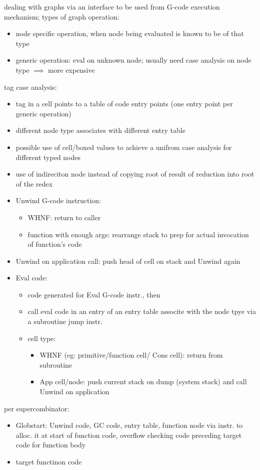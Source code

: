 \documentclass[8pt]{extarticle}
\begin{document}
\begin{multicols*}{2}
dealing with graphs via an interface to be used from G-code execution mechanism; types of graph operation:
\begin{itemize}
\item node specific operation, when node being evaluated is known to be of that type
\item generic operation: eval on unknown node; usually need case analysis on node type $\implies$ more expensive
\end{itemize}

tag case analysis:
\begin{itemize}
\item tag in a cell points to a table of code entry points (one entry point per generic operation)
\item different node type associates with different entry table
\item possible use of cell/boxed values to achieve a unifrom case analysis for different typed nodes
\item use of indireciton node instead of copying root of result of reduction into root of the redex
\item Unwind G-code instruction:
  \begin{itemize}
  \item WHNF: return to caller
  \item function with enough args: rearrange stack to prep for actual invocation of function's code
  \end{itemize}
\item Unwind on application call: push head of cell on stack and Unwind again
\item Eval code:
  \begin{itemize}
  \item code generated for Eval G-code instr., then
  \item call eval code in an entry of an entry table associte with the node tpye via a subroutine jump instr.
  \item cell type:
    \begin{itemize}
    \item WHNF (eg: primitive/function cell/ Cons cell): return from subroutine
    \item App cell/node: push current stack on dump (system stack) and call Unwind on application
    \end{itemize}
  \end{itemize}
\end{itemize}

per supercombinator:
\begin{itemize}
\item Globstart: Unwind code, GC code, entry table, function node via instr. to alloc. it at start of function code, overflow checking code preceding target code for function body
\item target functinon code
\end{itemize}


\end{multicols*}
\end{document}
